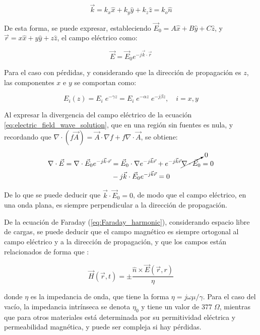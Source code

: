 \begin{equation}
	\label{eq:vector_numero_de_onda}
	\vec{k} = k_x \hat{x} + k_y \hat{y} + k_z \hat{z} = k_o \hat{n}
\end{equation}

De esta forma, se puede expresar, estableciendo $\vec{E}_0 = A \hat{x} + B \hat{y} + C \hat{z}$, y $\vec{r} = x \hat{x} + y \hat{y} + z \hat{z}$, el campo eléctrico como:

\begin{equation}
	\label{eq:electric_field_wave_solution}
	\vec{E} = \vec{E}_0 e^{-j\vec{k} \cdot \vec{r}}
\end{equation}

Para el caso con pérdidas, y considerando que la dirección de propagación es $z$, las componentes $x$ e $y$ se comportan como:

\begin{equation}
E_i(z) = E_i \; e^{-\gamma z} = E_i \; e^{-\alpha z} \; e^{-j \beta z}, \quad i=x,y
\end{equation}

Al expresar la divergencia del campo eléctrico de la ecuación \ref{eq:electric_field_wave_solution}, que en una región sin fuentes es nula, y recordando que $\nabla \cdot (f \vec{A}) = \vec{A} \cdot \nabla f + f \nabla \cdot \vec{A}$, se obtiene:

\begin{align}
	\nabla \cdot \vec{E} = \nabla \cdot \vec{E}_0 e^{-j\vec{k} \cdot \vec{r}} & = \vec{E}_0 \cdot \nabla e^{-j \vec{k} \vec{r}} + e^{-j \vec{k} \vec{r}} \cancelto{0}{\nabla \cdot \vec{E}_0} = 0 \\
	& -j \vec{k} \cdot \vec{E}_0 e^{-j \vec{k} \vec{r}} = 0
\end{align}

De lo que se puede deducir que $\vec{k} \cdot \vec{E}_0 = 0$, de modo que el campo eléctrico, en una onda plana, es siempre perpendicular a la dirección de propagación.

De la ecuación de Faraday (\ref{eq:Faraday_harmonic}), considerando espacio libre de cargas, se puede deducir que el campo magnético es siempre ortogonal al campo eléctrico y a la dirección de propagación, y que los campos están relacionados de forma que \cite{Fernandez:Electromag}:

\begin{equation}
	\vec{H}(\vec{r},t) = \pm \frac{\hat{n} \times \vec{E}(\vec{r},r)}{\eta}
\end{equation}

donde $\eta$ es la impedancia de onda, que tiene la forma $\eta = j \omega \mu / \gamma$. Para el caso del vacío, la impedancia intrínseca se denota $\eta_0$ y tiene un valor de $377\; \Omega$, mientras que para otros materiales está determinada por su permitividad eléctrica y permeabilidad magnética, y puede ser compleja si hay pérdidas.

